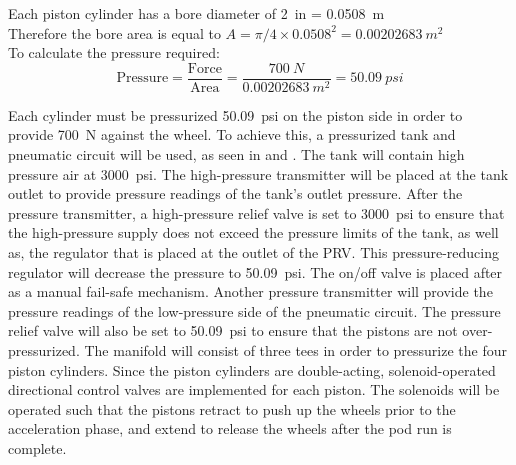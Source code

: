\documentclass[main.tex]{subfiles}
\begin{document}
	\begin{center}
		Each piston cylinder has a bore diameter of \SI{2}{in} = \SI{0.0508}{m}\\
        Therefore the bore area is equal to $A = \pi/4 \times {0.0508^2} = \SI{0.00202683}{m^2}$ \\
        To calculate the pressure required:
        \[
      \textrm{Pressure} = \frac{\textrm{Force}}{\textrm{Area}} = \frac{\SI{700}{N}}{\SI{0.00202683}{m^2}} = \SI{50.09}{psi}
        \]
	\end{center}

	Each cylinder must be pressurized \SI{50.09}{psi} on the piston side in order to provide \SI{700}{N} against the wheel. To achieve this, a pressurized tank and pneumatic circuit will be used, as seen in  and . The tank will contain high pressure air at \SI{3000}{psi}. The high-pressure transmitter will be placed at the tank outlet to provide pressure readings of the tank’s outlet pressure. After the pressure transmitter, a high-pressure relief valve is set to \SI{3000}{psi} to ensure that the high-pressure supply does not exceed the pressure limits of the tank, as well as, the regulator that is placed at the outlet of the PRV. This pressure-reducing regulator will decrease the pressure to \SI{50.09}{psi}. The on/off valve is placed after as a manual fail-safe mechanism. Another pressure transmitter will provide the pressure readings of the low-pressure side of the pneumatic circuit. The pressure relief valve will also be set to \SI{50.09}{psi} to ensure that the pistons are not over-pressurized. The manifold will consist of three tees in order to pressurize the four piston cylinders.  Since the piston cylinders are double-acting, solenoid-operated directional control valves are implemented for each piston. The solenoids will be operated such that the pistons retract to push up the wheels prior to the acceleration phase, and extend to release the wheels after the pod run is complete.\\
\end{document}
